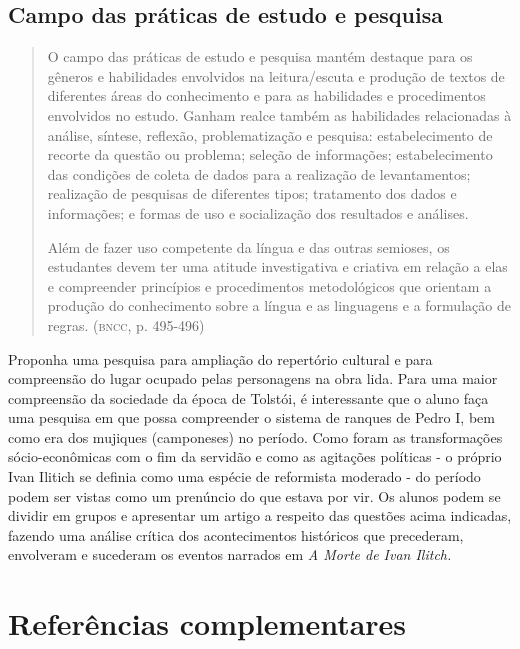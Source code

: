 \documentclass[12pt]{extarticle}
\begin{document}
\subsection{Campo das práticas de estudo e pesquisa}

\begin{quote}
O campo das práticas de estudo e pesquisa mantém destaque para os
gêneros e habilidades envolvidos na leitura/escuta e produção de textos
de diferentes áreas do conhecimento e para as habilidades e
procedimentos envolvidos no estudo. Ganham realce também as habilidades
relacionadas à análise, síntese, reflexão, problematização e pesquisa:
estabelecimento de recorte da questão ou problema; seleção de
informações; estabelecimento das condições de coleta de dados para a
realização de levantamentos; realização de pesquisas de diferentes
tipos; tratamento dos dados e informações; e formas de uso e
socialização dos resultados e análises.

Além de fazer uso competente da língua e das outras semioses, os
estudantes devem ter uma atitude investigativa e criativa em relação a
elas e compreender princípios e procedimentos metodológicos que orientam
a produção do conhecimento sobre a língua e as linguagens e a formulação
de regras. (\textsc{bncc}, p. 495-496)
\end{quote}


Proponha uma pesquisa para ampliação do repertório cultural e para
compreensão do lugar ocupado pelas personagens na obra lida. Para uma
maior compreensão da sociedade da época de Tolstói, é interessante que
o aluno faça uma pesquisa em que possa compreender o sistema de
ranques de Pedro I, bem como era dos mujiques (camponeses) no período.
Como foram as transformações sócio-econômicas com o fim da servidão e
como as agitações políticas - o próprio Ivan Ilitich se definia como
uma espécie de reformista moderado - do período podem ser vistas como
um prenúncio do que estava por vir. Os alunos podem se dividir em
grupos e apresentar um artigo a respeito das questões acima indicadas,
fazendo uma análise crítica dos acontecimentos históricos que
precederam, envolveram e sucederam os eventos narrados em \emph{A
Morte de Ivan Ilitch.}






\section{Referências complementares}
\end{document}
